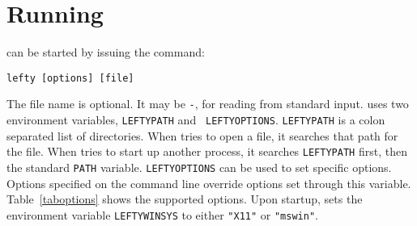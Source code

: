 \chapter{Running {\LEFTY}}
\label{apprunning}
{\LEFTY} can be started by issuing the command:

\vspace{-0.2in}
\begin{verbatim}
lefty [options] [file]
\end{verbatim}
\vspace{-0.2in}

\noindent
The file name is optional. It may be {\tt -}, for reading from standard input.
{\LEFTY} uses two environment variables, {\tt LEFTYPATH} and {\tt
LEFTYOPTIONS}.  {\tt LEFTYPATH} is a colon separated list of directories. When
{\LEFTY} tries to open a file, it searches that path for the file. When
{\LEFTY} tries to start up another process, it searches {\tt LEFTYPATH} first,
then the standard {\tt PATH} variable.  {\tt LEFTYOPTIONS} can be used to set
specific options.  Options specified on the command line override options set
through this variable. Table~\ref{taboptions} shows the supported options. Upon
startup, {\LEFTY} sets the environment variable {\tt LEFTYWINSYS} to either
{\tt "X11"} or {\tt "mswin"}.

